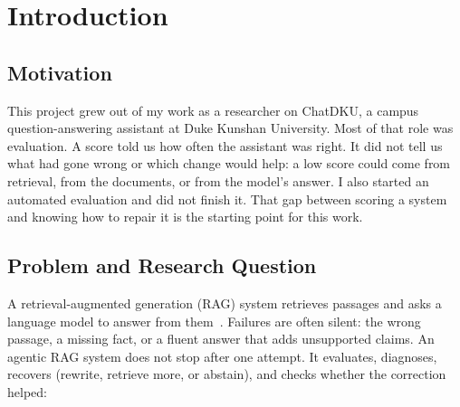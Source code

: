 \documentclass[12pt, a4paper, oneside]{report}
\begin{document}
\newpage


\setcounter{tocdepth}{1}
\listoffigures\newpage


\setcounter{tocdepth}{1}
\listoftables\newpage


\clearpage
{}


\chapter{Introduction}
\label{introduction}

\section{Motivation}

This project grew out of my work as a researcher on ChatDKU, a campus
question-answering assistant at Duke Kunshan University. Most of that role
was evaluation. A score told us how often the assistant was right. It did
not tell us what had gone wrong or which change would help: a low score
could come from retrieval, from the documents, or from the model's answer.
I also started an automated evaluation and did not finish it. That gap
between scoring a system and knowing how to repair it is the starting
point for this work.

\section{Problem and Research Question}

A retrieval-augmented generation (RAG) system retrieves passages and asks
a language model to answer from them~\cite{lewis2020rag}. Failures are
often silent: the wrong passage, a missing fact, or a fluent answer that
adds unsupported claims. An agentic RAG system does not stop after one
attempt. It evaluates, diagnoses, recovers (rewrite, retrieve more, or
abstain), and checks whether the correction helped:
\end{document}
